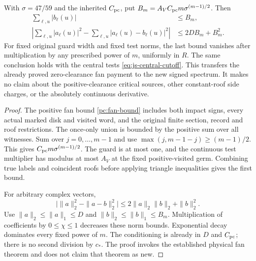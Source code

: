 \begin{corollary}
\label{cor:js-paid-fans}
With $\sigma=47/59$ and the inherited $C_{\rm pc}$, put
$B_m=A_VC_{\rm pc}m\sigma^{(m-1)/2}$. Then
\begin{equation}\label{eq:js-paid-fans}
 \begin{split}
 \sum_{\ell,u}|b_\ell(u)|&\le B_m,\\
 \left|\sum_{\ell,u}|a_\ell(u)|^2
       -\sum_{\ell,u}|a_\ell(u)-b_\ell(u)|^2\right|
                         &\le2DB_m+B_m^2.
 \end{split}
\end{equation}
For fixed original guard width and fixed test norms, the last
bound vanishes after multiplication by any prescribed power of
$m$, uniformly in $R$. The same conclusion holds with the
central tests \eqref{eq:js-central-cutoff}.
This transfers the already proved zero-clearance fan payment
to the new signed spectrum. It makes no claim about the
positive-clearance critical sources, other constant-roof side
charges, or the absolutely continuous derivative.
\end{corollary}
\begin{proof}
The positive fan bound \eqref{pc:fan-bound} includes both
impact signs, every actual marked disk and visited word, and
the original finite section, record and roof restrictions.
The once-only union is bounded by the positive sum over all
witnesses. Sum over $j=0,\ldots,m-1$ and use
$\max(j,m-1-j)\ge(m-1)/2$. This gives
$C_{\rm pc}m\sigma^{(m-1)/2}$. The guard is at most one,
and the continuous test multiplier has modulus at most $A_V$
at the fixed positive-visited germ. Combining true labels and
coincident roofs before applying triangle inequalities gives
the first bound.

For arbitrary complex vectors,
\[
 \big|\|a\|_2^2-\|a-b\|_2^2\big|
       \le2\|a\|_2\|b\|_2+\|b\|_2^2.
\]
Use $\|a\|_2\le\|a\|_1\le D$ and
$\|b\|_2\le\|b\|_1\le B_m$. Multiplication of coefficients
by $0\le\chi\le1$ decreases these norm bounds. Exponential
decay dominates every fixed power of $m$. The conditioning
is already in $D$ and $C_{\rm pc}$; there is no second
division by $c_*$. The proof invokes the established
physical fan theorem and does not claim that theorem as new.
\end{proof}

